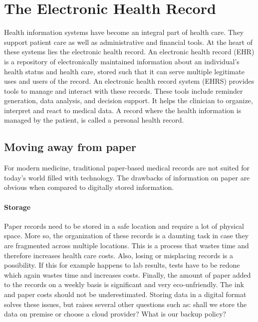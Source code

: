 \section{The Electronic Health Record}\label{background}

Health information systems have become an integral part of health care. They support patient care as well as administrative and financial tools. At the heart of these systems lies the electronic health record. An electronic health record (EHR) is a repository of electronically maintained information about an individual's health status and health care, stored such that it can serve multiple legitimate uses and users of the record\cite{Shortliffe2014}. An electronic health record system (EHRS) provides tools to manage and interact with these records. These tools include reminder generation, data analysis, and decision support. It helps the clinician to organize, interpret and react to medical data. A record where the  health information is managed by the patient, is called a personal health record\cite{Tang2006}.

    \subsection{Moving away from paper}\label{bg_paper}

    For modern medicine, traditional paper-based medical records are not suited for today's world filled with technology. The drawbacks of information on paper are obvious when compared to digitally stored information.

    \paragraph{Storage} Paper records need to be stored in a safe location and require a lot of physical space. More so, the organization of these records is a daunting task in case they are fragmented across multiple locations. This is a process that wastes time and therefore increases health care costs. Also, losing or misplacing records is a possibility. If this for example happens to lab results, tests have to be redone which again wastes time and increases costs. Finally, the amount of paper added to the records on a weekly basis is significant and very eco-unfriendly\cite{Saleem2009}. The ink and paper costs should not be underestimated. Storing data in a digital format solves these issues, but raises several other questions such as: shall we store the data on premise or choose a cloud provider? What is our backup policy? 

